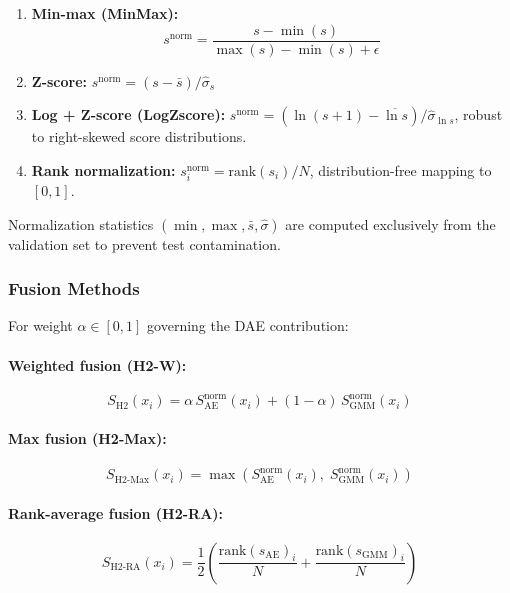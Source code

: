 \begin{enumerate}
  \item \textbf{Min-max (MinMax):}
  \begin{equation}
      s^{\text{norm}} = \frac{s - \min(s)}{\max(s) - \min(s) + \epsilon}
      \label{eq:minmax}
  \end{equation}
  \item \textbf{Z-score:} $s^{\text{norm}} = (s - \bar{s}) / \hat{\sigma}_s$
  \item \textbf{Log + Z-score (LogZscore):} $s^{\text{norm}} = (\ln(s + 1) - \overline{\ln s}) / \hat{\sigma}_{\ln s}$, robust to right-skewed score distributions.
  \item \textbf{Rank normalization:} $s^{\text{norm}}_i = \text{rank}(s_i) / N$, distribution-free mapping to $[0,1]$.
\end{enumerate}

Normalization statistics $(\min, \max, \bar{s}, \hat{\sigma})$ are computed exclusively from the validation set to prevent test contamination.

\subsubsection{Fusion Methods}
For weight $\alpha \in [0, 1]$ governing the DAE contribution:

\paragraph{Weighted fusion (H2-W):}
\begin{equation}
    S_{\text{H2}}(x_i) = \alpha \, S_{\text{AE}}^{\text{norm}}(x_i) + (1 - \alpha) \, S_{\text{GMM}}^{\text{norm}}(x_i)
    \label{eq:h2_weighted}
\end{equation}

\paragraph{Max fusion (H2-Max):}
\begin{equation}
    S_{\text{H2-Max}}(x_i) = \max\!\left(S_{\text{AE}}^{\text{norm}}(x_i),\; S_{\text{GMM}}^{\text{norm}}(x_i)\right)
    \label{eq:h2_max}
\end{equation}

\paragraph{Rank-average fusion (H2-RA):}
\begin{equation}
    S_{\text{H2-RA}}(x_i) = \frac{1}{2}\!\left(\frac{\text{rank}(s_{\text{AE}})_i}{N} + \frac{\text{rank}(s_{\text{GMM}})_i}{N}\right)
    \label{eq:h2_rankavg}
\end{equation}

